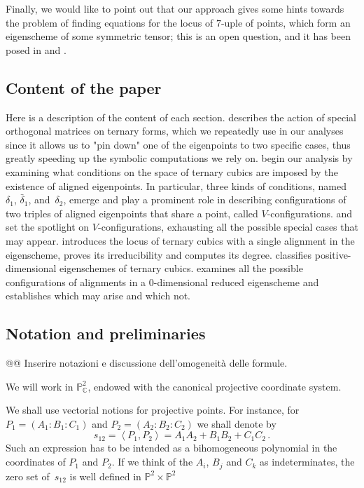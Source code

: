 \documentclass[a4paper, 11pt, reqno]{amsart}
\theoremstyle{plain}
\theoremstyle{definition}
\newcommand{\C}{\mathbb{C}}
\newcommand{\p}{\mathbb{P}}
\newcommand{\scl}[2]{\left\langle {#1}, {#2} \right\rangle}
\begin{document}
Finally, we would like to point out that our approach gives some hints towards the problem of finding equations for the locus of $7$-uple of points, which form an eigenscheme of some symmetric tensor; this is an open question, and it has been posed in \cite{ASS} and \cite{Ottaviani24}.

\subsection*{Content of the paper}
Here is a description of the content of each section.
 describes the action of special orthogonal matrices on ternary forms, which we repeatedly use in our analyses since it allows us to "pin down" one of the eigenpoints to two specific cases, thus greatly speeding up the symbolic computations we rely on.
 begin our analysis by examining what conditions on the space of ternary cubics are imposed by the existence of aligned eigenpoints. In particular, three kinds of conditions, named~$\delta_1$, $\bar{\delta}_1$, and~$\delta_2$, emerge and play a prominent role in describing configurations of two triples of aligned eigenpoints that share a point, called $V$-configurations.
 and  set the spotlight on $V$-configurations, exhausting all the possible special cases that may appear.
 introduces the locus of ternary cubics with a single alignment in the eigenscheme, proves its irreducibility and computes its degree.
 classifies positive-dimensional eigenschemes of ternary cubics.
 examines all the possible configurations of alignments in a $0$-dimensional reduced eigenscheme and establishes which may arise and which not.

\subsection{Notation and preliminaries}
@@ Inserire notazioni e discussione dell'omogeneità delle formule.

We will work in $\p^2_\C$, endowed with the canonical projective coordinate system.

We shall use vectorial notions for projective points. 
For instance, for $P_1=(A_1:B_1:C_1)$ and $P_2=(A_2:B_2:C_2)$ we shall denote by
%
\[
  s_{12} = \scl{P_1}{P_2} = A_1 A_2 + B_1 B_2 + C_1 C_2 \,.
\]
%
Such an expression has to be intended as a bihomogeneous polynomial in the coordinates of $P_1$ and $P_2$. If we think of the $A_i$, $B_j$ and $C_k$ as indeterminates, the zero set of~$s_{12}$ is well defined in $\p^2 \times \p^2$
\end{document}
